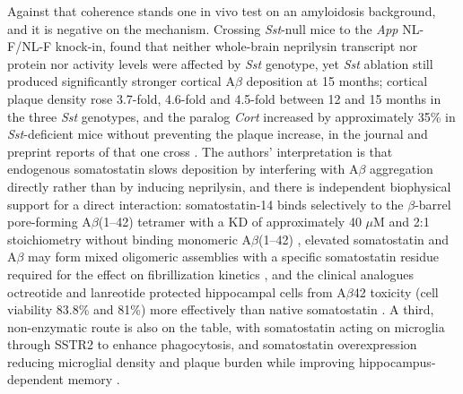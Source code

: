 \documentclass[11pt]{article}
\begin{document}
Against that coherence stands one in vivo test on an amyloidosis background, and it is negative on the mechanism. Crossing \emph{Sst}-null mice to the \emph{App} NL-F/NL-F knock-in, \citet{Williams2023} found that neither whole-brain neprilysin transcript nor protein nor activity levels were affected by \emph{Sst} genotype, yet \emph{Sst} ablation still produced significantly stronger cortical A$\beta$ deposition at 15 months; cortical plaque density rose 3.7-fold, 4.6-fold and 4.5-fold between 12 and 15 months in the three \emph{Sst} genotypes, and the paralog \emph{Cort} increased by approximately 35\% in \emph{Sst}-deficient mice without preventing the plaque increase, in the journal and preprint reports of that one cross \citep{Williams2023,Williams2022}. The authors' interpretation is that endogenous somatostatin slows deposition by interfering with A$\beta$ aggregation directly rather than by inducing neprilysin, and there is independent biophysical support for a direct interaction: somatostatin-14 binds selectively to the $\beta$-barrel pore-forming A$\beta$(1--42) tetramer with a KD of approximately 40 $\mu$M and 2:1 stoichiometry without binding monomeric A$\beta$(1--42) \citep{Puig2020}, elevated somatostatin and A$\beta$ may form mixed oligomeric assemblies with a specific somatostatin residue required for the effect on fibrillization kinetics \citep{Solarski2018}, and the clinical analogues octreotide and lanreotide protected hippocampal cells from A$\beta$42 toxicity (cell viability 83.8\% and 81\%) more effectively than native somatostatin \citep{Pham2025}. A third, non-enzymatic route is also on the table, with somatostatin acting on microglia through SSTR2 to enhance phagocytosis, and somatostatin overexpression reducing microglial density and plaque burden while improving hippocampus-dependent memory \citep{Jung2026}.
\end{document}
